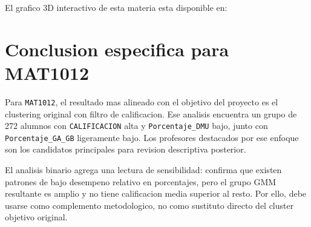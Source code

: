 \documentclass[11pt,letterpaper]{article}
\newcommand{\code}[1]{\texttt{#1}}
\begin{document}
El grafico 3D interactivo de esta materia esta disponible en:

\begin{center}
\parbox{0.9\textwidth}{\centering\footnotesize{}}
\end{center}

\section{Conclusion especifica para MAT1012}

Para \code{MAT1012}, el resultado mas alineado con el objetivo del proyecto es el clustering original con filtro de calificacion. Ese analisis encuentra un grupo de 272 alumnos con \code{CALIFICACION} alta y \code{Porcentaje\_DMU} bajo, junto con \code{Porcentaje\_GA\_GB} ligeramente bajo. Los profesores destacados por ese enfoque son los candidatos principales para revision descriptiva posterior.

El analisis binario agrega una lectura de sensibilidad: confirma que existen patrones de bajo desempeno relativo en porcentajes, pero el grupo GMM resultante es amplio y no tiene calificacion media superior al resto. Por ello, debe usarse como complemento metodologico, no como sustituto directo del cluster objetivo original.

\end{document}
